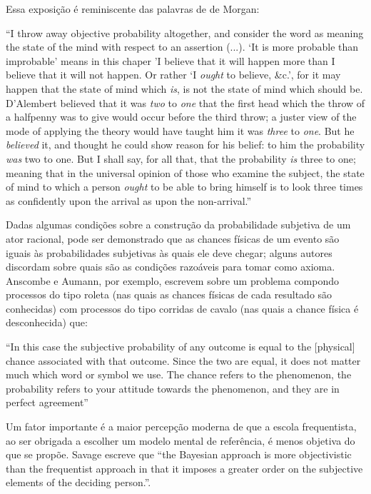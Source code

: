 \documentclass[12pt,a4paper]{article}
\begin{document}
Essa exposição é reminiscente das palavras de de Morgan:

``I throw away objective probability altogether, and consider the word as meaning the state of the mind with respect to an 
assertion (...). `It is more probable than improbable' means in this chaper 'I believe that it will happen more than I 
believe that it will not happen. Or rather `I {\em ought} to believe, \&c.', for it may happen that the state of mind which {\em
is}, is not the state of mind which should be. 
D'Alembert believed that it was {\em two} to {\em one} that the first head which the throw of a halfpenny was to give would occur
before the third throw; a juster view of the mode of applying the theory would have taught him it was {\em three} to {\em one}.
But he {\em believed} it, and thought he could show reason for his belief: to him the probability {\em was} two to one. But 
I shall say, for all that, that the probability {\em is} three to one; meaning that in the universal opinion of those who
examine the subject, the state of mind to which a person {\em ought} to be able to bring himself is to look three times
as confidently upon the arrival as upon the non-arrival.''\cite{deMorgan1847}

Dadas algumas condições sobre a construção da
probabilidade subjetiva de um ator racional, pode ser demonstrado que as chances físicas de um evento são iguais 
às probabilidades subjetivas às quais ele deve chegar;
alguns autores discordam sobre quais são as condições razoáveis para tomar como axioma. Anscombe e Aumann, por exemplo,
escrevem sobre um problema compondo processos do tipo roleta (nas quais as chances físicas de cada resultado são conhecidas) 
com processos do tipo corridas de cavalo (nas quais a chance física é desconhecida) que:

``In this case the subjective probability of any outcome is equal to the [physical] chance associated with that outcome.
Since the two are equal, it does not matter much which word or symbol we use. The
chance refers to the phenomenon, the probability refers to your attitude
towards the phenomenon, and they are in perfect agreement''\cite{Anscombe63}

Um fator importante é a maior percepção moderna
de que a escola frequentista, ao ser obrigada a escolher um modelo mental de referência, é menos objetiva do que se propõe.
Savage escreve que ``the Bayesian approach is more objectivistic than the frequentist approach in that it imposes a greater
order on the subjective elements of the deciding person.''\cite{Savage60}.	
\end{document}
